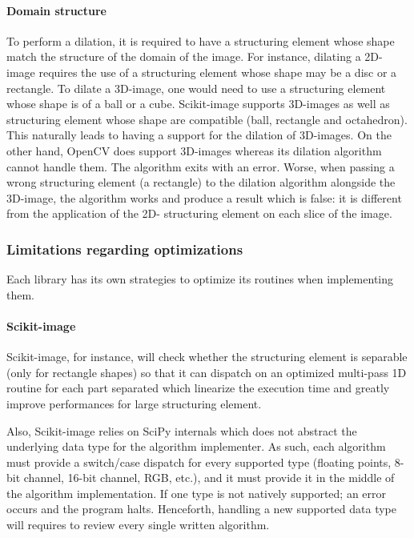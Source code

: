 \paragraph{Domain structure} To perform a dilation, it is required to have a structuring element whose shape match the
structure of the domain of the image. For instance, dilating a 2D-image requires the use of a structuring element whose
shape may be a disc or a rectangle. To dilate a 3D-image, one would need to use a structuring element whose shape is of
a ball or a cube. Scikit-image supports 3D-images as well as structuring element whose shape are compatible (ball,
rectangle and octahedron). This naturally leads to having a support for the dilation of 3D-images. On the other hand,
OpenCV does support 3D-images whereas its dilation algorithm cannot handle them. The algorithm exits with an error.
Worse, when passing a wrong structuring element (a rectangle) to the dilation algorithm alongside the 3D-image, the
algorithm works and produce a result which is false: it is different from the application of the 2D- structuring element
on each slice of the image.


\subsubsection{Limitations regarding optimizations}

Each library has its own strategies to optimize its routines when implementing them.

\paragraph{Scikit-image} Scikit-image, for instance, will check whether the structuring element is separable (only for
rectangle shapes) so that it can dispatch on an optimized multi-pass 1D routine for each part separated which linearize
the execution time and greatly improve performances for large structuring element.

Also, Scikit-image relies on SciPy internals which does not abstract the underlying data type for the algorithm
implementer. As such, each algorithm must provide a switch/case dispatch for every supported type (floating points,
8-bit channel, 16-bit channel, RGB, etc.), and it must provide it in the middle of the algorithm implementation. If one
type is not natively supported; an error occurs and the program halts. Henceforth, handling a new supported data type
will requires to review every single written algorithm.

